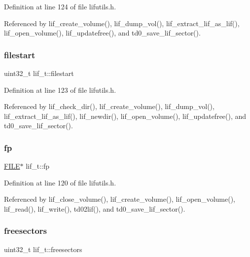 Definition at line 124 of file lifutils.\+h.



Referenced by lif\+\_\+create\+\_\+volume(), lif\+\_\+dump\+\_\+vol(), lif\+\_\+extract\+\_\+lif\+\_\+as\+\_\+lif(), lif\+\_\+open\+\_\+volume(), lif\+\_\+updatefree(), and td0\+\_\+save\+\_\+lif\+\_\+sector().

\mbox{\label{structlif__t_a3c1bcc66b694d07ebc304ef7cb66b4ef}} 
\subsubsection{\texorpdfstring{filestart}{filestart}}
{\footnotesize\ttfamily uint32\+\_\+t lif\+\_\+t\+::filestart}



Definition at line 123 of file lifutils.\+h.



Referenced by lif\+\_\+check\+\_\+dir(), lif\+\_\+create\+\_\+volume(), lif\+\_\+dump\+\_\+vol(), lif\+\_\+extract\+\_\+lif\+\_\+as\+\_\+lif(), lif\+\_\+newdir(), lif\+\_\+open\+\_\+volume(), lif\+\_\+updatefree(), and td0\+\_\+save\+\_\+lif\+\_\+sector().

\mbox{\label{structlif__t_ad679ba16ca21371a649981a4cca9e64c}} 
\subsubsection{\texorpdfstring{fp}{fp}}
{\footnotesize\ttfamily \hyperlink{posix_8h_aed4dabeb9f7c518ded42f930a04abce8}{F\+I\+LE}$\ast$ lif\+\_\+t\+::fp}



Definition at line 120 of file lifutils.\+h.



Referenced by lif\+\_\+close\+\_\+volume(), lif\+\_\+create\+\_\+volume(), lif\+\_\+open\+\_\+volume(), lif\+\_\+read(), lif\+\_\+write(), td02lif(), and td0\+\_\+save\+\_\+lif\+\_\+sector().

\mbox{\label{structlif__t_a1fc11461eb5643d84e229772f7623152}} 
\subsubsection{\texorpdfstring{freesectors}{freesectors}}
{\footnotesize\ttfamily uint32\+\_\+t lif\+\_\+t\+::freesectors}




